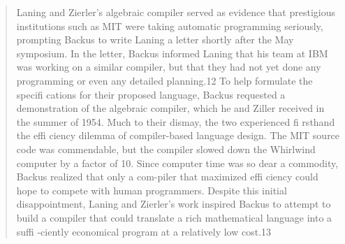 \begin{quotation}
Laning and Zierler's algebraic compiler served as evidence that prestigious 
institutions such as MIT were taking automatic programming seriously, prompting 
Backus to write Laning a letter shortly after the May symposium. In the letter, 
Backus informed Laning that his team at IBM was working on a similar compiler, 
but that they had not yet done any programming or even any detailed planning.12 
To help formulate the specifi cations for their proposed language, Backus 
requested a demonstration of the algebraic compiler, which he and Ziller 
received in the summer of 1954. Much to their dismay, the two experienced fi 
rsthand the effi ciency dilemma of compiler-based language design. The MIT 
source code was commendable, but the compiler slowed down the Whirlwind 
computer by a factor of 10. Since computer time was so dear a commodity, Backus 
realized that only a com-piler that maximized effi ciency could hope to compete 
with human programmers. Despite this initial disappointment, Laning and 
Zierler's work inspired Backus to attempt to build a compiler that could 
translate a rich mathematical language into a suffi -ciently economical program 
at a relatively low cost.13
\cite{grace_hopper_and_the_invention_of_the_information_age_2009}
\end{quotation}


